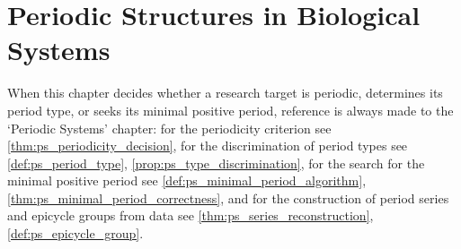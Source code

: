 \chapter{Periodic Structures in Biological Systems}

\begin{remark}\label{rem:bio_ps_hook}
When this chapter decides whether a research target is periodic, determines its period type, or seeks its minimal positive period, reference is always made to the `Periodic Systems' chapter:
for the periodicity criterion see \cref{thm:ps_periodicity_decision},
for the discrimination of period types see \cref{def:ps_period_type}, \cref{prop:ps_type_discrimination},
for the search for the minimal positive period see \cref{def:ps_minimal_period_algorithm}, \cref{thm:ps_minimal_period_correctness},
and for the construction of period series and epicycle groups from data see \cref{thm:ps_series_reconstruction}, \cref{def:ps_epicycle_group}.
\end{remark}

